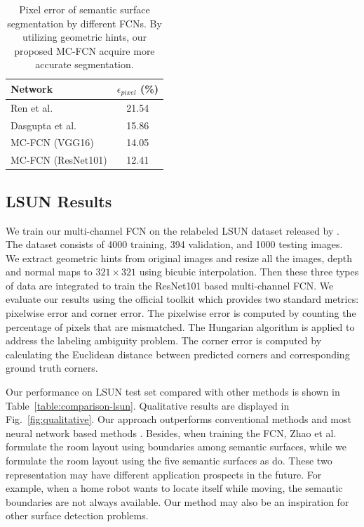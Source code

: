 \begin{table}
	\centering
	\begin{tabular}{l|c} 
		\hline
		Network & $\epsilon_{pixel}$ (\%)\\
		\hline
		Ren et al.~\cite{ren2016coarse} & 21.54 \\
		Dasgupta et al.~\cite{dasgupta2016delay} & 15.86 \\  \hline
		MC-FCN (VGG16)  & 14.05 \\
		MC-FCN (ResNet101) & 12.41 \\
		\hline
	\end{tabular}
	\caption{Pixel error of semantic surface segmentation by different FCNs. By utilizing geometric hints, our proposed MC-FCN acquire more accurate segmentation. }	
	\label{table:ablation}
\end{table}

\subsection{LSUN Results}
\label{sec:LSUN}
We train our multi-channel FCN on the relabeled LSUN dataset released by \cite{ren2016coarse}. The dataset consists of 4000 training, 394 validation, and 1000 testing images. We extract geometric hints from original images and resize all the images, depth and normal maps to $321\times321$ using bicubic interpolation. Then these three types of data are integrated to train the ResNet101 based multi-channel FCN. We evaluate our results using the official toolkit which provides two standard metrics: pixelwise error and corner error. The pixelwise error is computed by counting the percentage of pixels that are mismatched. The Hungarian algorithm is applied to address the labeling ambiguity problem.
The corner error is computed by calculating the Euclidean distance between predicted corners and corresponding ground truth corners.

Our performance on LSUN test set compared with other methods is shown in Table~\ref{table:comparison-lsun}. Qualitative results are displayed in Fig.~\ref{fig:qualitative}. Our approach outperforms conventional methods \cite{hedau2009recovering} and most neural network based methods  \cite{mallya2015learning,zhang2017learning,dasgupta2016delay,ren2016coarse,LeeRoomNet17}. 
%
Besides, when training the FCN, Zhao et al.~\cite{zhao2017physics} formulate the room layout using boundaries among semantic surfaces, while we formulate the room layout using the five semantic surfaces as \cite{dasgupta2016delay} do. These two representation may have different application prospects in the future. For example, when a home robot wants to locate itself while moving, the semantic boundaries are not always available. Our method may also be an inspiration for other surface detection problems.

